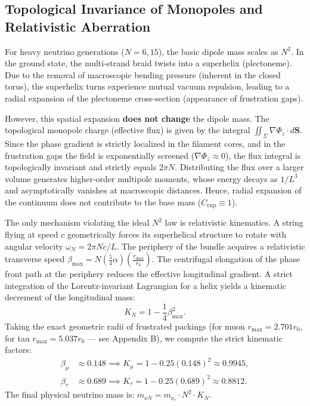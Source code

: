 \documentclass[11pt,a4paper]{article}
\begin{document}
\subsection{Topological Invariance of Monopoles and Relativistic Aberration}
For heavy neutrino generations ($N=6,15$), the basic dipole mass scales as $N^2$. In the ground state, the multi-strand braid twists into a superhelix (plectoneme). Due to the removal of macroscopic bending pressure (inherent in the closed torus), the superhelix turns experience mutual vacuum repulsion, leading to a radial expansion of the plectoneme cross-section (appearance of frustration gaps).

However, this spatial expansion \textbf{does not change} the dipole mass. The topological monopole charge (effective flux) is given by the integral $\iint_\Sigma \nabla \Phi_z \cdot d\mathbf{S}$. Since the phase gradient is strictly localized in the filament cores, and in the frustration gaps the field is exponentially screened ($\nabla \Phi_z \approx 0$), the flux integral is topologically invariant and strictly equals $2\pi N$. Distributing the flux over a larger volume generates higher-order multipole moments, whose energy decays as $1/L^3$ and asymptotically vanishes at macroscopic distances. Hence, radial expansion of the continuum does not contribute to the base mass ($C_{\text{exp}} \equiv 1$).

The only mechanism violating the ideal $N^2$ law is relativistic kinematics. A string flying at speed $c$ geometrically forces its superhelical structure to rotate with angular velocity $\omega_N = 2\pi N c / L$. The periphery of the bundle acquires a relativistic transverse speed $\beta_{\text{max}} = N (\frac{5}{4}\alpha) (\frac{r_{\text{max}}}{r_0})$.
The centrifugal elongation of the phase front path at the periphery reduces the effective longitudinal gradient. A strict integration of the Lorentz-invariant Lagrangian for a helix yields a kinematic decrement of the longitudinal mass:
\begin{equation}
K_N = 1 - \frac{1}{4} \beta_{\text{max}}^2.
\end{equation}
Taking the exact geometric radii of frustrated packings (for muon $r_{\text{max}} = 2.701 r_0$, for tau $r_{\text{max}} = 5.037 r_0$ — see Appendix B), we compute the strict kinematic factors:
\begin{align}
\beta_\mu &\approx 0.148 \implies K_\mu = 1 - 0.25(0.148)^2 \approx \mathbf{0.9945}, \\
\beta_\tau &\approx 0.689 \implies K_\tau = 1 - 0.25(0.689)^2 \approx \mathbf{0.8812}.
\end{align}
The final physical neutrino mass is: $m_{\nu N} = m_{\nu_e} \cdot N^2 \cdot K_N$.
\end{document}
